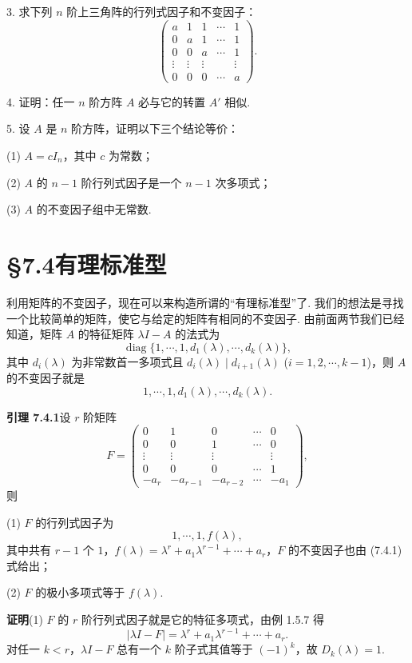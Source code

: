 \documentclass[UTF8, 12pt, fontset=fandol, oneside]{ctexart}
\begin{document}
3. 求下列 $n$ 阶上三角阵的行列式因子和不变因子：
\[
\left(\begin{array}{ccccc}
a & 1 & 1 & \cdots & 1\\
0 & a & 1 & \cdots & 1\\
0 & 0 & a & \cdots & 1\\
\vdots & \vdots & \vdots & & \vdots\\
0 & 0 & 0 & \cdots & a
\end{array}\right).
\]

4. 证明：任一 $n$ 阶方阵 $A$ 必与它的转置 $A'$ 相似.

5. 设 $A$ 是 $n$ 阶方阵，证明以下三个结论等价：

(1) $A=cI_n$，其中 $c$ 为常数；

(2) $A$ 的 $n-1$ 阶行列式因子是一个 $n-1$ 次多项式；

(3) $A$ 的不变因子组中无常数.

\section*{§7.4\quad 有理标准型}

利用矩阵的不变因子，现在可以来构造所谓的“有理标准型”了. 我们的想法是寻找一个比较简单的矩阵，使它与给定的矩阵有相同的不变因子. 由前面两节我们已经知道，矩阵 $A$ 的特征矩阵 $\lambda I-A$ 的法式为
\[
\operatorname{diag}\{1,\cdots,1,d_1(\lambda),\cdots,d_k(\lambda)\},
\]
其中 $d_i(\lambda)$ 为非常数首一多项式且 $d_i(\lambda)\mid d_{i+1}(\lambda)$ ($i=1,2,\cdots,k-1$)，则 $A$ 的不变因子就是
\[
1,\cdots,1,d_1(\lambda),\cdots,d_k(\lambda).
\]

\noindent\textbf{引理 7.4.1}\quad 设 $r$ 阶矩阵
\[
F=\left(\begin{array}{ccccc}
0 & 1 & 0 & \cdots & 0\\
0 & 0 & 1 & \cdots & 0\\
\vdots & \vdots & \vdots & & \vdots\\
0 & 0 & 0 & \cdots & 1\\
-a_r & -a_{r-1} & -a_{r-2} & \cdots & -a_1
\end{array}\right),
\]
则

(1) $F$ 的行列式因子为
\begin{equation}
1,\cdots,1,f(\lambda),
\tag{7.4.1}
\end{equation}
其中共有 $r-1$ 个 $1$，$f(\lambda)=\lambda^r+a_1\lambda^{r-1}+\cdots+a_r$，$F$ 的不变因子也由 (7.4.1) 式给出；

(2) $F$ 的极小多项式等于 $f(\lambda)$.

\noindent\textbf{证明}\quad (1) $F$ 的 $r$ 阶行列式因子就是它的特征多项式，由例 1.5.7 得
\[
|\lambda I-F|=\lambda^r+a_1\lambda^{r-1}+\cdots+a_r.
\]
对任一 $k<r$，$\lambda I-F$ 总有一个 $k$ 阶子式其值等于 $(-1)^k$，故 $D_k(\lambda)=1$.
\end{document}
